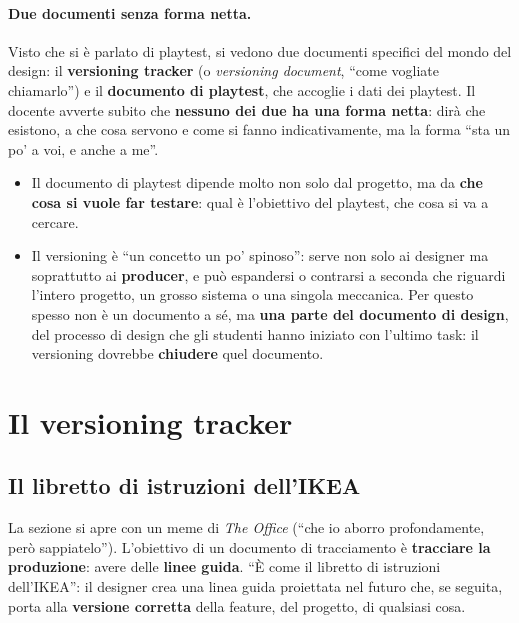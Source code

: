\paragraph{Due documenti senza forma netta.} Visto che si è parlato di
playtest, si vedono due documenti specifici del mondo del design: il
\textbf{versioning tracker} (o \emph{versioning document}, ``come vogliate
chiamarlo'') e il \textbf{documento di playtest}, che accoglie i dati dei
playtest. Il docente avverte subito che \textbf{nessuno dei due ha una forma
netta}: dirà che esistono, a che cosa servono e come si fanno
indicativamente, ma la forma ``sta un po' a voi, e anche a me''.
\begin{itemize}
  \item Il documento di playtest dipende molto non solo dal progetto, ma da
        \textbf{che cosa si vuole far testare}: qual è l'obiettivo del
        playtest, che cosa si va a cercare.
  \item Il versioning è ``un concetto un po' spinoso'': serve non solo ai
        designer ma soprattutto ai \textbf{producer}, e può espandersi o
        contrarsi a seconda che riguardi l'intero progetto, un grosso
        sistema o una singola meccanica. Per questo spesso non è un
        documento a sé, ma \textbf{una parte del documento di design}, del
        processo di design che gli studenti hanno iniziato con l'ultimo
        task: il versioning dovrebbe \textbf{chiudere} quel documento.
\end{itemize}

\section{Il versioning tracker}
\label{gd10:sec:versioning}



\subsection{Il libretto di istruzioni dell'IKEA}

La sezione si apre con un meme di \emph{The Office} (``che io aborro
profondamente, però sappiatelo''). L'obiettivo di un documento di
tracciamento è \textbf{tracciare la produzione}: avere delle \textbf{linee
guida}. ``È come il libretto di istruzioni dell'IKEA'': il designer crea una
linea guida proiettata nel futuro che, se seguita, porta alla
\textbf{versione corretta} della feature, del progetto, di qualsiasi cosa.

